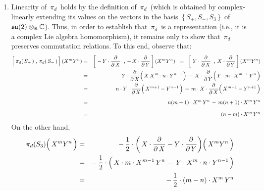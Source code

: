 \begin{enumerate}
\item
	Linearity of \,$\pi_{d}$\, holds by the definition of \,$\pi_{d}$\,
	(which is obtained by complex-linearly extending its values on the vectors in the basis
	\,$\{\,S_{+}, S_{-}, S_{3}\,\}$\, of \,$\mathfrak{su}(2) \otimes_{\mathbb{R}}\mathbb{C}$).
	Thus, in order to establish that \,$\pi_{d}$\, is a representation (i.e., it is a complex Lie algebra homomorphism),
	it remains only to show that \,$\pi_{d}$\, preserves commutation relations.
	To this end, observe that:
	\begin{eqnarray*}
	\left[\;
		\overset{{\color{white}1}}{\pi_{d}}\!\left(\,S_{+}\,\right)
		\, , \,
		\pi_{d}\!\left(\,S_{-}\,\right)
		\,\right]
		(X^{m}Y^{n})
	& = &
		\left[\;
			-\,Y\cdot\dfrac{\partial}{\partial\,X}
			\;\; , \,
			-\,X\cdot\dfrac{\partial}{\partial\,Y}
			\,\right]
			(X^{m}Y^{n})
	\;\; = \;\;
		\left[\;
			Y\cdot\dfrac{\partial}{\partial\,X}
			\;\; , \,
			X\cdot\dfrac{\partial}{\partial\,Y}
			\,\right]
			(X^{m}Y^{n})
	\\
	& = &
		Y\cdot\dfrac{\partial}{\partial\,X}\!\left(\,
			\overset{{\color{white}.}}{X}\,X^{m} \cdot n \cdot Y^{n-1}
			\,\right)
		\, - \,
		X\cdot\dfrac{\partial}{\partial\,Y}\!\left(\,
			\overset{{\color{white}.}}{Y} \cdot m \cdot X^{m-1} \, Y^{n}
			\,\right)
	\\
	& = &
		n \cdot Y \cdot \dfrac{\partial}{\partial\,X}\!\left(\,
			\overset{{\color{white}.}}{X^{m+1}} - Y^{n-1}
			\,\right)
		\, - \,
		m \cdot X \cdot \dfrac{\partial}{\partial\,X}\!\left(\,
			\overset{{\color{white}.}}{X^{m-1}} - Y^{n+1}
			\,\right)
	\\
	& = &
		n(m+1) \cdot \overset{{\color{white}1}}{X^{m}}\,Y^{n} \, - \, m(n+1) \cdot X^{m}\,Y^{n}
	\\
	& = &
		(n-m) \cdot \overset{{\color{white}1}}{X^{m}\,Y^{n}}
	\end{eqnarray*}
	On the other hand,
	\begin{eqnarray*}
	\pi_{d}(S_{3})\!\left(\,\overset{{\color{white}.}}{X^{m}Y^{n}}\,\right)
	& = &
		-\,\dfrac{1}{2}\cdot\left(\,X\cdot\dfrac{\partial}{\partial\,X} - Y\cdot\dfrac{\partial}{\partial\,Y}\right)
		\!\left(\,\overset{{\color{white}.}}{X^{m}Y^{n}}\,\right)
	\\
	& = &
		-\,\dfrac{1}{2}\cdot\left(\,
			\overset{{\color{white}.}}{X} \cdot m \cdot X^{m-1}\,Y^{n}
			\, - \,
			Y \cdot X^{m} \cdot n \cdot Y^{n-1}
			\,\right)
	\\
	& = &
		- \, \dfrac{1}{2} \cdot (m-n) \cdot \overset{{\color{white}1}}{X^{m}\,Y^{n}}

\end{eqnarray*}
\end{enumerate}

